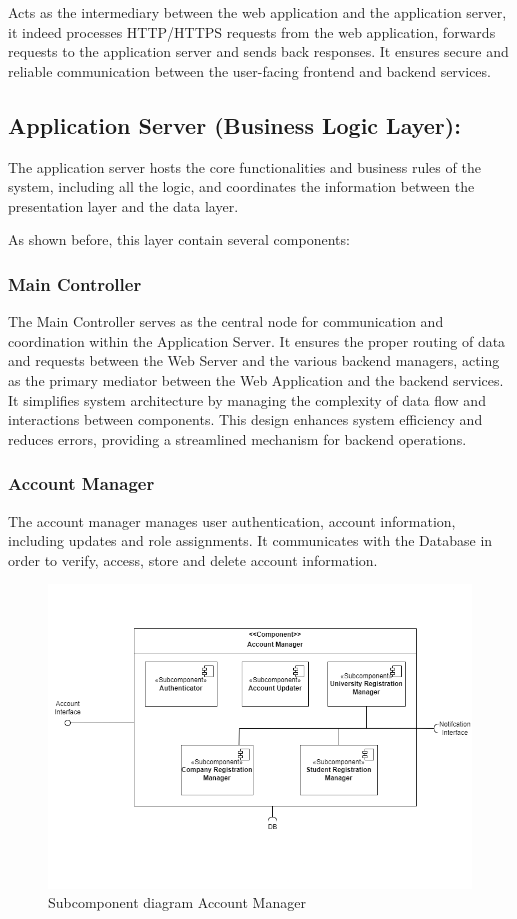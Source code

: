 Acts as the intermediary between the web application and the application server, it indeed processes HTTP/HTTPS requests from the web application, forwards requests to the application server and sends back responses. It ensures secure and reliable communication between the user-facing frontend and backend services.


\subsection{Application Server (Business Logic Layer):}
\label{subsec:application_server}%

The application server hosts the core functionalities and business rules of the system, including all the logic, and coordinates the information between the presentation layer and the data layer.

As shown before, this layer contain several components:
\subsubsection{Main Controller}
The Main Controller serves as the central node for communication and coordination within the Application Server. It ensures the proper routing of data and requests between the Web Server and the various backend managers, acting as the primary mediator between the Web Application and the backend services.
It simplifies system architecture by managing the complexity of data flow and interactions between components. This design enhances system efficiency and reduces errors, providing a streamlined mechanism for backend operations.

\subsubsection{Account Manager}
         The account manager manages user authentication, account information, including updates and role assignments. It communicates with the Database in order to verify, access, store and delete account information.
    
    \begin{figure}[H]
    \centering
    \includegraphics[width=0.7\linewidth]{DD/Images/Comp&Sub/Account Manager.png}
    \caption{Subcomponent diagram Account Manager}
    \label{fig:account_manager}
    \end{figure}

